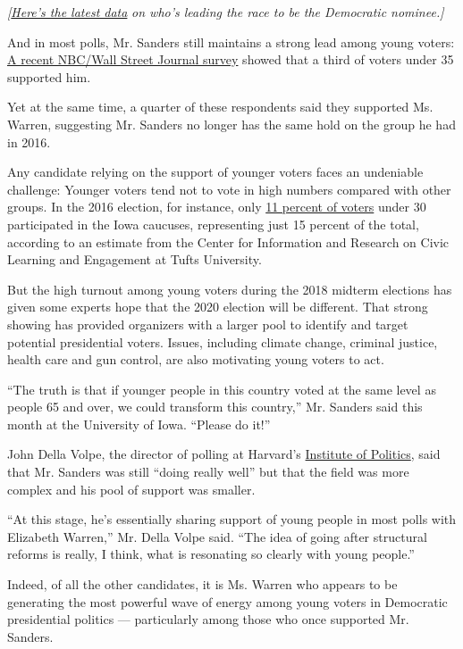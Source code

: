 \emph{{[}}\href{https://www.nytimes3xbfgragh.onion/interactive/2020/us/elections/democratic-polls.html?action=click\&module=Intentional\&pgtype=Article}{\emph{Here's
the latest data}} \emph{on who's leading the race to be the Democratic
nominee.{]}}

And in most polls, Mr. Sanders still maintains a strong lead among young
voters:
\href{https://www.cnbc.com/2019/09/17/biden-warren-lead-in-latest-nbcwsj-2020-democratic-poll.html}{A
recent NBC/Wall Street Journal survey} showed that a third of voters
under 35 supported him.

Yet at the same time, a quarter of these respondents said they supported
Ms. Warren, suggesting Mr. Sanders no longer has the same hold on the
group he had in 2016.

Any candidate relying on the support of younger voters faces an
undeniable challenge: Younger voters tend not to vote in high numbers
compared with other groups. In the 2016 election, for instance, only
\href{https://civicyouth.org/iowa-caucuses-2016/}{11 percent of voters}
under 30 participated in the Iowa caucuses, representing just 15 percent
of the total, according to an estimate from the Center for Information
and Research on Civic Learning and Engagement at Tufts University.

But the high turnout among young voters during the 2018 midterm
elections has given some experts hope that the 2020 election will be
different. That strong showing has provided organizers with a larger
pool to identify and target potential presidential voters. Issues,
including climate change, criminal justice, health care and gun control,
are also motivating young voters to act.

``The truth is that if younger people in this country voted at the same
level as people 65 and over, we could transform this country,'' Mr.
Sanders said this month at the University of Iowa. ``Please do it!''

John Della Volpe, the director of polling at Harvard's
\href{http://www.iop.harvard.edu/}{Institute of Politics}, said that Mr.
Sanders was still ``doing really well'' but that the field was more
complex and his pool of support was smaller.

``At this stage, he's essentially sharing support of young people in
most polls with Elizabeth Warren,'' Mr. Della Volpe said. ``The idea of
going after structural reforms is really, I think, what is resonating so
clearly with young people.''

Indeed, of all the other candidates, it is Ms. Warren who appears to be
generating the most powerful wave of energy among young voters in
Democratic presidential politics --- particularly among those who once
supported Mr. Sanders.

